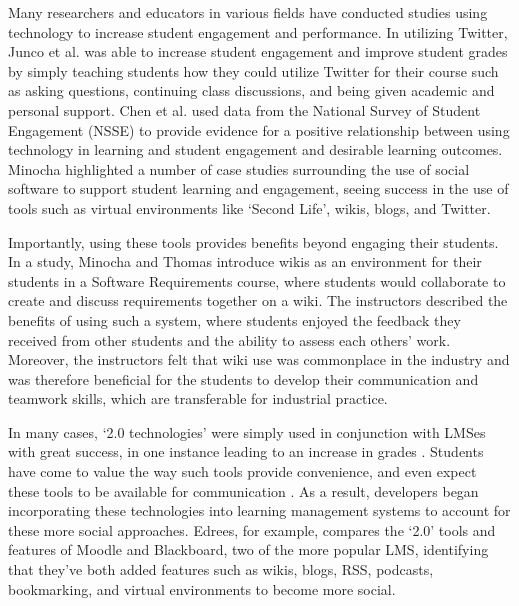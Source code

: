 \begin{itemize}
Many researchers and educators in various fields have conducted studies using technology to increase student engagement and performance. In utilizing Twitter, Junco et al. \cite{junco2011effect} was able to increase student engagement and improve student grades by simply teaching students how they could utilize Twitter for their course such as asking questions, continuing class discussions, and being given academic and personal support. Chen et al. \cite{chen2010engaging} used data from the National Survey of Student Engagement (NSSE) to provide evidence for a positive relationship between using technology in learning and student engagement and desirable learning outcomes. Minocha \cite{minocha2009study} highlighted a number of case studies surrounding the use of social software to support student learning and engagement, seeing success in the use of tools such as virtual environments like `Second Life', wikis, blogs, and Twitter.

Importantly, using these tools provides benefits beyond engaging their students. In a study, Minocha and Thomas \cite{minocha2007collaborative} introduce wikis as an environment for their students in a Software Requirements course, where students would collaborate to create and discuss requirements together on a wiki. The instructors described the benefits of using such a system, where students enjoyed the feedback they received from other students and the ability to assess each others' work. Moreover, the instructors felt that wiki use was commonplace in the industry and was therefore beneficial for the students to develop their communication and teamwork skills, which are transferable for industrial practice.

In many cases, `2.0 technologies' were simply used in conjunction with LMSes with great success, in one instance leading to an increase in grades \cite{conde2014evolving}. Students have come to value the way such tools provide convenience, and even expect these tools to be available for communication \cite{caruso2007ecar}. As a result, developers began incorporating these technologies into learning management systems to account for these more social approaches. Edrees, for example, \cite{edrees2013elearning} compares the `2.0' tools and features of Moodle and Blackboard, two of the more popular LMS, identifying that they’ve both added features such as wikis, blogs, RSS, podcasts, bookmarking, and virtual environments to become more social.


\end{itemize}
